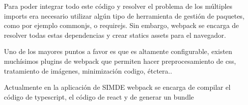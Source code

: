     Para poder integrar todo este código y resolver el problema de los múltiples imports era necesario utilizar algún tipo de herramienta de gestión de paquetes, como por ejemplo commonjs, o requirejs. Sin embargo, webpack se encarga de resolver todas estas dependencias y crear statics assets para el navegador.



Uno de los mayores puntos a favor es que es altamente configurable, existen muchísimos plugins de webpack que permiten hacer preprocesamiento de css, tratamiento de imágenes, minimización codigo, étctera.. 

Actualmente en la aplicación de SIMDE webpack  se encarga de compilar el código de typescript, el código de react y de generar un bundle 